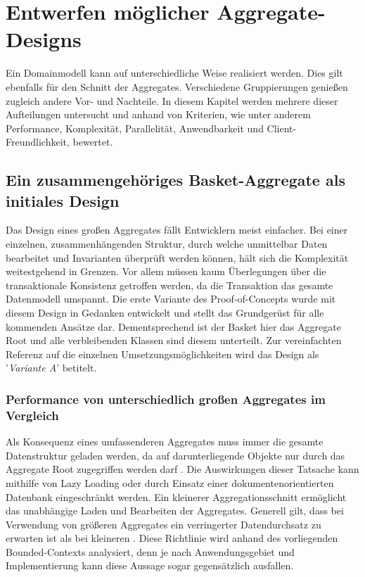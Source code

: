 \chapter{Entwerfen möglicher Aggregate-Designs}

Ein Domainmodell kann auf unterschiedliche Weise realisiert werden. Dies gilt ebenfalls für den Schnitt der Aggregates. Verschiedene Gruppierungen genießen zugleich andere Vor- und Nachteile. In diesem Kapitel werden mehrere dieser Aufteilungen untersucht und anhand von Kriterien, wie unter anderem Performance, Komplexität, Parallelität, Anwendbarkeit und Client-Freundlichkeit, bewertet.

\section{Ein zusammengehöriges Basket-Aggregate als initiales Design}

Das Design eines großen Aggregates fällt Entwicklern meist einfacher. Bei einer einzelnen, zusammenhängenden Struktur, durch welche unmittelbar Daten bearbeitet und Invarianten überprüft werden können, hält sich die Komplexität weitestgehend in Grenzen. Vor allem müssen kaum Überlegungen über die transaktionale Konsistenz getroffen werden, da die Transaktion das gesamte Datenmodell umspannt. Die erste Variante des Proof-of-Concepts wurde mit diesem Design in Gedanken entwickelt und stellt das Grundgerüst für alle kommenden Ansätze dar. Dementsprechend ist der Basket hier das Aggregate Root und alle verbleibenden Klassen sind diesem unterteilt. Zur vereinfachten Referenz auf die einzelnen Umsetzungsmöglichkeiten wird das Design als '\emph{Variante A}' betitelt.

\subsection{Performance von unterschiedlich großen Aggregates im Vergleich}

Als Konsequenz eines umfassenderen Aggregates muss immer die gesamte Datenstruktur geladen werden, da auf darunterliegende Objekte nur durch das Aggregate Root zugegriffen werden darf \cite[S. 128]{Evans.2011}. Die Auswirkungen dieser Tatsache kann mithilfe von \gls{Lazy Loading} oder durch Einsatz einer dokumentenorientierten Datenbank eingeschränkt werden. Ein kleinerer Aggregationsschnitt ermöglicht das unabhängige Laden und Bearbeiten der Aggregates. Generell gilt, dass bei Verwendung von größeren Aggregates ein verringerter Datendurchsatz zu erwarten ist als bei kleineren \cite[S. 355f.]{Vernon.2015}. Diese Richtlinie wird anhand des vorliegenden Bounded-Contexts analysiert, denn je nach Anwendungsgebiet und Implementierung kann diese Aussage sogar gegensätzlich ausfallen. 

